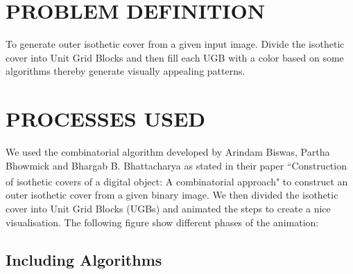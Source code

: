 \documentclass[12pt]{article}
\begin{document}
\newpage




\section{PROBLEM DEFINITION}
To generate outer isothetic cover from a given input image. Divide the isothetic cover into Unit Grid Blocks and then fill each UGB with a color based on some algorithms thereby generate visually appealing patterns.


\section{PROCESSES USED}
We used the combinatorial algorithm developed by Arindam Biswas, Partha Bhowmick and Bhargab B. Bhattacharya as stated in their paper ``Construction of isothetic covers of a digital object: A combinatorial approach"\textsuperscript{\cite{lamport94}} to construct an outer isothetic cover from a given binary image. We then divided the isothetic cover into Unit Grid Blocks (UGBs) and animated the steps to create a nice visualisation. The following figure show different phases of the animation: 

 


\subsection{Including Algorithms}
\end{document}
